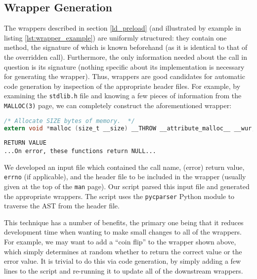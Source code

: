 \subsection{Wrapper Generation}
The wrappers described in section \ref{ld_preload} (and illustrated by example in listing \ref{lst:wrapper_example}) are uniformly structured: they contain one method, the signature of which is known beforehand (as it is identical to that of the overridden call). Furthermore, the only information needed about the call in question is its signature (nothing specific about its implementation is necessary for generating the wrapper). Thus, wrappers are good candidates for automatic code generation by inspection of the appropriate header files. For example, by examining the \texttt{stdlib.h} file and knowing a few pieces of information from the \texttt{MALLOC(3)} page, we can completely construct the aforementioned wrapper:

\begin{lstlisting}[caption=Excerpt from \texttt{/usr/include/stdlib.h}, language=C]
/* Allocate SIZE bytes of memory.  */
extern void *malloc (size_t __size) __THROW __attribute_malloc__ __wur;
\end{lstlisting}

\begin{lstlisting}[caption=Excerpt from \texttt{MALLOC(3)}]
RETURN VALUE
...On error, these functions return NULL...
\end{lstlisting}

We developed an input file which contained the call name, (error) return value, \texttt{errno} (if applicable), and the header file to be included in the wrapper (usually given at the top of the \texttt{man} page). Our script parsed this input file and generated the appropriate wrappers. The script uses the \texttt{pycparser} Python module \cite{pycparser} to traverse the AST from the header file.

This technique has a number of benefits, the primary one being that it reduces development time when wanting to make small changes to all of the wrappers. For example, we may want to add a ``coin flip'' to the wrapper shown above, which simply determines at random whether to return the correct value or the error value. It is trivial to do this via code generation, by simply adding a few lines to the script and re-running it to update all of the downstream wrappers.